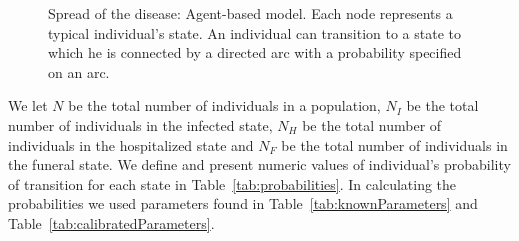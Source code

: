 %
\begin{figure}[h!]
\begin{center}
\end{center}
\caption{Spread of the disease: Agent-based model. Each node represents a typical individual's state. An individual can transition to a state to which he is connected by a directed arc with a probability specified on an arc.}
\label{ABM}
\end{figure}
We let $N$ be the total number of individuals in a population, $N_{I}$  be the total number of individuals in the infected state, $N_{H}$  be the total number of individuals in the hospitalized state and $N_{F}$ be the total number of individuals in the funeral state. We define and present numeric values of individual's probability of transition for each state in Table~\ref{tab:probabilities}. In calculating the probabilities we used parameters found in Table~\ref{tab:knownParameters} and Table~\ref{tab:calibratedParameters}.

